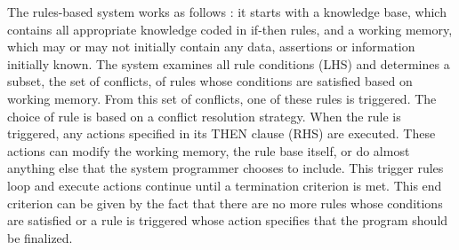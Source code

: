
The rules-based system works as follows \cite{grosan2011}: it starts with a knowledge base, which contains all appropriate knowledge coded in if-then rules, and a working memory, which may or may not initially contain any data, assertions or information initially known. The system examines all rule conditions (LHS) and determines a subset, the set of conflicts, of rules whose conditions are satisfied based on working memory. From this set of conflicts, one of these rules is triggered. The choice of rule is based on a conflict resolution strategy. When the rule is triggered, any actions specified in its THEN clause (RHS) are executed. These actions can modify the working memory, the rule base itself, or do almost anything else that the system programmer chooses to include. This trigger rules loop and execute actions continue until a termination criterion is met. This end criterion can be given by the fact that there are no more rules whose conditions are satisfied or a rule is triggered whose action specifies that the program should be finalized.


